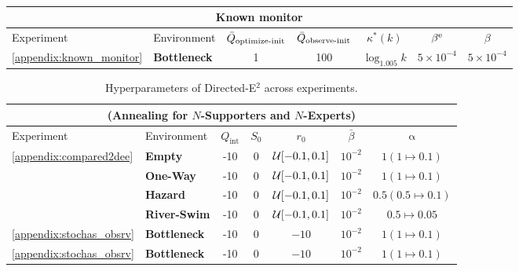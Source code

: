 \begin{table}[tbh]
\begin{tabular}{ |m{6em} m{6em} c c c c c c c c| }
    \hline
    \end{tabular}
    \\[3 pt]
    \strut\hskip0.25in
    \begin{tabular}{ |m{6em} m{6em} c c c c c| }     
    \hline
    \multicolumn{7}{|c|}{Known monitor} \\
    \hline
    Experiment & Environment  & $\bar{Q}_{\text{optimize-init}}$ & $\bar{Q}_{\text{observe-init}}$ & $\kappa^*(k)$ & $\beta^\text{e}$ & $\beta$\\
    \hline
    \multirow{1}{6em}{\cref{appendix:known_monitor}} & \textbf{Bottleneck} & 1 & 100 & $\log_{1.005}k$ & $5 \times 10^{-4}$ & $5 \times 10^{-4}$\\ 
    \hline
    \end{tabular}
\end{table}
%
%
%
 \begin{table}[tbh]
    \caption{Hyperparameters of Directed-E$^2$ across experiments.}
    \scriptsize\centering
    \begin{tabular}{ |m{6em} m{6em} c c c c c| }     
    \hline
    \multicolumn{7}{|c|}{(Annealing for $N$-Supporters and $N$-Experts)} \\
    \hline
    Experiment & Environment & $Q_{\text{int}}$ & $S_0$ & $r_0$ & $\bar{\beta}$ & $\upalpha$  \\
    \hline
    \multirow{4}{6em}{\cref{appendix:compared2dee}} & \textbf{Empty} & -10 & 0 & $\mathcal{U}[-0.1, 0.1]$ & $10^{-2}$ & $1 (1 \mapsto 0.1)$  \\
    & \textbf{One-Way} & -10 & 0 & $\mathcal{U}[-0.1, 0.1]$ & $10^{-2}$ & $1 (1 \mapsto 0.1)$  \\
    & \textbf{Hazard} & -10 & 0 & $\mathcal{U}[-0.1, 0.1]$ & $10^{-2}$ & $0.5 (0.5 \mapsto 0.1)$  \\ 
    & \textbf{River-Swim} & -10 & 0 & $\mathcal{U}[-0.1, 0.1]$ & $10^{-2}$ & $0.5 \mapsto 0.05$  \\
    \hline
    \multirow{1}{6em}{\cref{appendix:stochas_obsrv}} & \textbf{Bottleneck} & -10 & 0 & $-10$ & $10^{-2}$ & $1 (1 \mapsto 0.1)$  \\
    \hline
    \multirow{1}{6em}{\cref{appendix:stochas_obsrv}} & \textbf{Bottleneck} & -10 & 0 & $-10$ & $10^{-2}$ & $1 (1 \mapsto 0.1)$  \\
    \hline
    \end{tabular}
\end{table}
%
%
%
